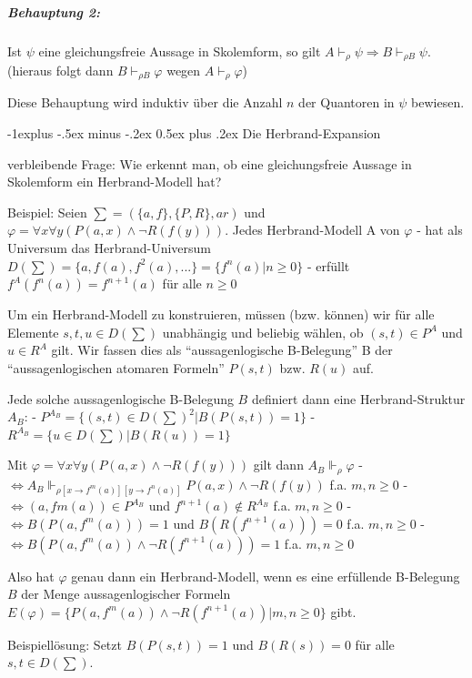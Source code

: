 \documentclass[a4paper]{article}
\makeatletter
\renewcommand{\subsection}{\@startsection{subsection}{2}{0mm}%
                {-1explus -.5ex minus -.2ex}%
                {0.5ex plus .2ex}%
                {\normalfont\normalsize\bfseries}}
\makeatother
\begin{document}
\begin{multicols}{3}
  \subparagraph{Behauptung 2:}\label{behauptung-2}

  Ist $\psi$ eine gleichungsfreie Aussage in Skolemform, so gilt
  $A\vdash_\rho \psi \Rightarrow B\vdash_{\rho B}\psi$. (hieraus folgt dann
  $B\vdash_{\rho B}\varphi$ wegen $A\vdash_\rho \varphi$)

  Diese Behauptung wird induktiv über die Anzahl $n$ der Quantoren in
  $\psi$ bewiesen.

  \subsection{Die Herbrand-Expansion}\label{die-herbrand-expansion}

  verbleibende Frage: Wie erkennt man, ob eine gleichungsfreie Aussage in
  Skolemform ein Herbrand-Modell hat?

  Beispiel: Seien $\sum=(\{a,f\},\{P,R\},ar)$ und
  $\varphi=\forall x\forall y (P(a,x)\wedge\lnot R(f(y)))$.  Jedes Herbrand-Modell A von $\varphi$ - hat als Universum das Herbrand-Universum $D(\sum)=\{a,f(a),f^2 (a),...\}=\{f^n(a)|n\geq 0\}$ - erfüllt $f^A(f^n(a))= f^{n+1} (a)$ für alle $n\geq 0$

  Um ein Herbrand-Modell zu konstruieren, müssen (bzw. können) wir für
  alle Elemente $s,t,u\in D(\sum)$ unabhängig und beliebig wählen, ob
  $(s,t)\in P^A$ und $u\in R^A$ gilt. Wir fassen dies als
  ``aussagenlogische B-Belegung'' B der ``aussagenlogischen atomaren
  Formeln'' $P(s,t)$ bzw. $R(u)$ auf.

  Jede solche aussagenlogische B-Belegung $B$ definiert dann eine
  Herbrand-Struktur $A_B$: -
  $P^{A_B} = \{(s,t)\in D(\sum)^2 |B(P(s,t))= 1\}$ -
  $R^{A_B} = \{u\in D(\sum) |B(R(u))= 1\}$

  Mit $\varphi=\forall x\forall y(P(a,x)\wedge\lnot R(f(y)))$ gilt dann
  $A_B \Vdash_\rho \varphi$ -
  $\Leftrightarrow A_B \Vdash_{\rho[x\rightarrow f^m(a)][y\rightarrow f^n(a)]} P(a,x)\wedge\lnot R(f(y))$
  f.a. $m,n\geq 0$ - $\Leftrightarrow (a,fm(a))\in P^{A_B}$ und
  $f^{n+1}(a)\not\in R^{A_B}$ f.a. $m,n\geq 0$ -
  $\Leftrightarrow B(P(a,f^m(a)))= 1$ und $B(R(f^{n+1} (a)))= 0$ f.a.
  $m,n\geq 0$ -
  $\Leftrightarrow B(P(a,f^m(a))\wedge\lnot R(f^{n+1} (a)))= 1$ f.a.
  $m,n\geq 0$

  Also hat $\varphi$ genau dann ein Herbrand-Modell, wenn es eine
  erfüllende B-Belegung $B$ der Menge aussagenlogischer Formeln
  $E(\varphi)=\{P(a,f^m(a))\wedge\lnot R(f^{n+1}(a)) | m,n\geq 0\}$ gibt.

  Beispiellösung: Setzt $B(P(s,t))= 1$ und $B(R(s))= 0$ für alle
  $s,t\in D(\sum)$.


\end{multicols}
\end{document}

